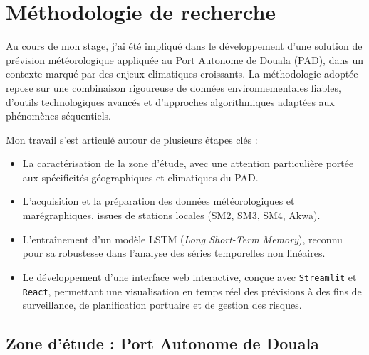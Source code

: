 \documentclass[a4paper,12pt,openany]{report}
\begin{document}
	
	\clearpage {}

 \newpage{}


 
 


\chapter{Méthodologie de recherche}



Au cours de mon stage, j’ai été impliqué dans le développement d’une solution de prévision météorologique appliquée au Port Autonome de Douala (PAD), dans un contexte marqué par des enjeux climatiques croissants. La méthodologie adoptée repose sur une combinaison rigoureuse de données environnementales fiables, d’outils technologiques avancés et d’approches algorithmiques adaptées aux phénomènes séquentiels.

Mon travail s’est articulé autour de plusieurs étapes clés :
\begin{itemize}
	\item La caractérisation de la zone d’étude, avec une attention particulière portée aux spécificités géographiques et climatiques du PAD.
	\item L’acquisition et la préparation des données météorologiques et marégraphiques, issues de stations locales (SM2, SM3, SM4, Akwa).
	\item L’entraînement d’un modèle LSTM (\textit{Long Short-Term Memory}), reconnu pour sa robustesse dans l’analyse des séries temporelles non linéaires.
	\item Le développement d’une interface web interactive, conçue avec \texttt{Streamlit} et \texttt{React}, permettant une visualisation en temps réel des prévisions à des fins de surveillance, de planification portuaire et de gestion des risques.
\end{itemize}

\section{Zone d’étude : Port Autonome de Douala}
\end{document}
